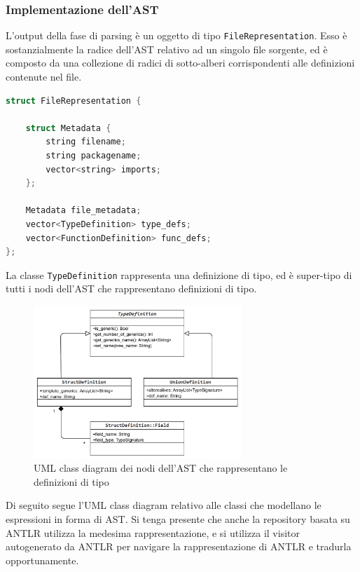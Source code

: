 \subsubsection{Implementazione dell'AST}
L'output della fase di parsing è un oggetto di tipo \texttt{FileRepresentation}. Esso 
è sostanzialmente la radice dell'AST relativo ad un singolo file sorgente, ed è 
composto da una collezione di radici di sotto-alberi corrispondenti alle definizioni contenute 
nel file. \\

\vspace{0.5cm}
\begin{lstlisting}[language=C++, frame=single]
struct FileRepresentation {

    struct Metadata {
        string filename;
        string packagename;
        vector<string> imports;
    };

    Metadata file_metadata;
    vector<TypeDefinition> type_defs;
    vector<FunctionDefinition> func_defs;
};
\end{lstlisting}
\vspace{0.5cm}

La classe \texttt{TypeDefinition} rappresenta una definizione di tipo, ed è super-tipo
di tutti i nodi dell'AST che rappresentano definizioni di tipo. \\

\begin{figure}[H]
    \centering
        \includegraphics[width=0.7\textwidth]{../../Assets/TypeDefAST.png}
    \caption{
        \centering
        UML class diagram dei nodi dell'AST che rappresentano le definizioni di tipo
    }
\end{figure}

\newpage

Di seguito segue l'UML class diagram relativo alle classi che modellano 
le espressioni in forma di AST. Si tenga presente che anche la repository
basata su ANTLR utilizza la medesima rappresentazione, e si utilizza il visitor 
autogenerato da ANTLR per navigare la rappresentazione di ANTLR e tradurla opportunamente.

